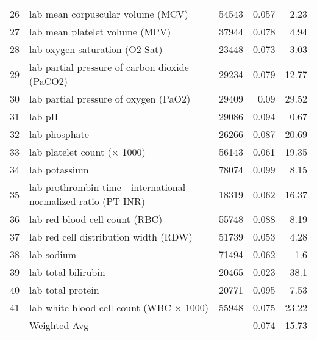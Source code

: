 \begin{table*}[h]
{\begin{tabular}{llrrr}
26 & lab mean corpuscular volume (MCV) & 54543 & 0.057 & 2.23 \\
27 & lab mean platelet volume (MPV) & 37944 & 0.078 & 4.94 \\
28 & lab oxygen saturation (O2 Sat) & 23448 & 0.073 & 3.03 \\
29 & lab partial pressure of carbon dioxide (PaCO2) & 29234 & 0.079 & 12.77 \\
30 & lab partial pressure of oxygen (PaO2) & 29409 & 0.09 & 29.52 \\
31 & lab pH & 29086 & 0.094 & 0.67 \\
32 & lab phosphate & 26266 & 0.087 & 20.69 \\
33 & lab platelet count (× 1000) & 56143 & 0.061 & 19.35 \\
34 & lab potassium & 78074 & 0.099 & 8.15 \\
35 & lab prothrombin time - international normalized ratio (PT-INR) & 18319 & 0.062 & 16.37 \\
36 & lab red blood cell count (RBC) & 55748 & 0.088 & 8.19 \\
37 & lab red cell distribution width (RDW) & 51739 & 0.053 & 4.28 \\
38 & lab sodium & 71494 & 0.062 & 1.6 \\
39 & lab total bilirubin & 20465 & 0.023 & 38.1 \\
40 & lab total protein & 20771 & 0.095 & 7.53 \\
41 & lab white blood cell count (WBC × 1000) & 55948 & 0.075 & 23.22 \\
\midrule
   & Weighted Avg & - & 0.074 & 15.73 \\
\bottomrule
\end{tabular}%
}
\end{table*}

